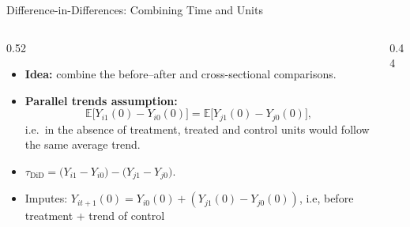 \documentclass[10pt]{beamer}
\theoremstyle{plain}
\begin{document}
\begin{frame}{Difference-in-Differences: Combining Time and Units}
  \begin{columns}[T,totalwidth=\textwidth]
    \begin{column}{0.52\textwidth}
      \begin{itemize}
        \item \textbf{Idea:} combine the before--after and cross-sectional comparisons.
        \item \textbf{Parallel trends assumption:}
        \[
          \mathbb{E}\bigl[Y_{i1}(0) - Y_{i0}(0)\bigr]
          = \mathbb{E}\bigl[Y_{j1}(0) - Y_{j0}(0)\bigr],
        \]
        i.e.\ in the absence of treatment, treated and control units would follow the same average trend.
        \item $ \tau_{\text{DiD}}
          = \bigl(Y_{i1} - Y_{i0}\bigr)
            - \bigl(Y_{j1} - Y_{j0}\bigr).$
        \item Imputes: $Y_{it+1}(0) = Y_{i0}(0) + (Y_{j1}(0) - Y_{j0}(0))$, i.e, before treatment + trend of control
      \end{itemize}
    \end{column}
    \begin{column}{0.44\textwidth}
      \centering
\end{column}
\end{columns}
\end{frame}
\end{document}
